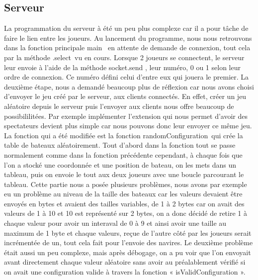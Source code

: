 \documentclass{article}
\begin{document}
	\subsection{Serveur}
	La programmation du serveur \`a \'et\'e un peu plus complexe car il a pour t\^ache de faire le lien entre les joueurs. 
	\newline Au lancement du programme, nous nous retrouvons dans la fonction principale \guillemotleft main \guillemotright\ en attente de demande de connexion, tout cela par la méthode
	\guillemotleft.select\guillemotright \ vu en cours. 
	Lorsque 2 joueurs se connectent, le serveur leur envoie \`a l\textquoteright aide de la m\'ethode \guillemotleft socket.send \guillemotright , leur num\'ero, 0 ou 1 selon leur ordre de connexion. Ce num\'ero d\'efini celui d'entre eux qui jouera le premier.
	\newline La deuxième \'etape, nous a demand\'e beaucoup plus de r\'eflexion car nous avons choisi d'envoyer le jeu cr\'e\'e par le serveur, aux clients connect\'es.
	\newline En effet, cr\'eer un jeu al\'eatoire depuis le serveur puis l\textquoteright envoyer aux clients nous offre beaucoup de possibililit\'ees. Par exemple impl\'ementer l\textquoteright extension qui nous permet d'avoir des spectateurs devient plus simple car nous pouvons donc leur envoyer ce m\^eme jeu.
	\newline La fonction qui a \'et\'e modifi\'ee est la fonction \guillemotleft randomConfiguration\guillemotright \ qui cr\'ee la table de bateaux al\'eatoirement.
	Tout d\textquoteright abord dans la fonction tout se passe normalement comme dans la fonction pr\'ec\'edente cependant, \`a chaque fois que l\textquoteright on a stock\'e une coordonn\'ee et une position de bateau, on les mets dans un tableau, puis on envoie le tout aux deux joueurs avec une boucle parcourant le tableau.
	\newline Cette partie nous a pos\'ee plusieurs probl\`emes, nous avons par exemple eu un probl\`eme au niveau de la taille des bateaux car les valeurs devaient \^etre envoy\'es en  bytes et avaient des tailles variables, de 1 \`a 2 bytes car on avait des valeurs de 1 \`a 10 et 10 est représent\'e sur 2 bytes, on a donc d\'ecid\'e de retire 1 à chaque valeur pour avoir un interaval de 0 à 9 et ainsi avoir une taille au maximum de 1 byte et chaque valeurs, reçue de l’autre c\^ot\'e par les joueurs serait incr\'ement\'ee de un, tout cela fait pour l’envoie des navires. 
	\newline Le deuxième problème était aussi un peu complexe, mais après débogage, on a pu voir que l’on envoyait avant directement chaque valeur aléatoire sans avoir au préalablement vérifié si on avait une configuration valide à travers la fonction « isValidConfiguration ».
\end{document}
